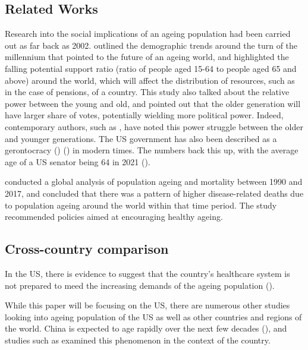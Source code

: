 \documentclass[11pt]{article}
\begin{document}
\subsection*{Related Works}
Research into the social implications of an ageing population had been carried out as far back as 2002. \cite{tinker2002social} outlined the demographic trends around the turn of the millennium that pointed to the future of an ageing world, and highlighted the falling potential support ratio (ratio of people aged 15-64 to people aged 65 and above) around the world, which will affect the distribution of resources, such as in the case of pensions, of a country. This study also talked about the relative power between the young and old, and pointed out that the older generation will have larger share of votes, potentially wielding more political power. Indeed, contemporary authors, such as \cite{Munger+2022}, have noted this power struggle between the older and younger generations. The US government has also been described as a gerontocracy (\cite{noah_2019}) (\cite{thompson_2020}) in modern times. The numbers back this up, with the average age of a US senator being 64 in 2021 (\cite{manning_2022}).

\cite{Cheng2020} conducted a global analysis of population ageing and mortality between 1990 and 2017, and concluded that there was a pattern of higher disease-related deaths due to population ageing around the world within that time period. The study recommended policies aimed at encouraging healthy ageing.

\subsection*{Cross-country comparison}
\label{subsec:crosscountrycomparison}
In the US, there is evidence to suggest that the country's healthcare system is not prepared to meed the increasing demands of the ageing population (\cite{foley_retooling_2020}).

While this paper will be focusing on the US, there are numerous other studies looking into ageing population of the US as well as other countries and regions of the world. China is expected to age rapidly over the next few decades (\cite{BeardsonTimothy2021Ag:C}), and studies such as \cite{LuoYanan2021TaCf} examined this phenomenon in the context of the country.
\end{document}
